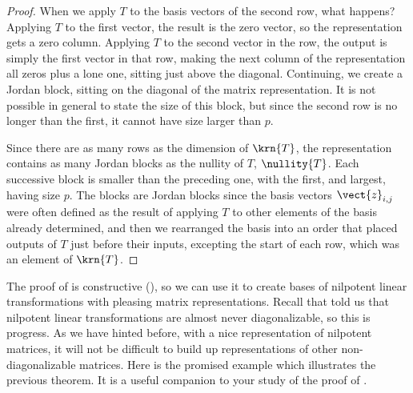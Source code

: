 \begin{proof}
%
When we apply $T$ to the basis vectors of the second row, what happens?  Applying $T$ to the first vector, the result is the zero vector, so the representation gets a zero column.  Applying $T$ to the second vector in the row, the output is simply the first vector in that row, making the next column of the representation all zeros plus a lone one, sitting just above the diagonal.  Continuing, we create a Jordan block, sitting on the diagonal of the matrix representation.  It is not possible in general to state the size of this block, but since the second row is no longer than the first, it cannot have size larger than $p$.\par
%
Since there are as many rows as the dimension of $\krn{T}$, the representation contains as many Jordan blocks as the nullity of $T$, $\nullity{T}$.  Each successive block is smaller than the preceding one, with the first, and largest, having size $p$.  The blocks are Jordan blocks since the basis vectors $\vect{z}_{i,j}$ were often defined as the result of applying $T$ to other elements of the basis already determined, and then we rearranged the basis into an order that placed outputs of $T$ just before their inputs, excepting the start of each row, which was an element of $\krn{T}$.
%
\end{proof}
%
The proof of  is constructive (), so we can use it to create bases of nilpotent linear transformations with pleasing matrix representations.  Recall that  told us that nilpotent linear transformations are almost never diagonalizable, so this is progress.  As we have hinted before, with a nice representation of nilpotent matrices, it will not be difficult to build up representations of other non-diagonalizable matrices.  Here is the promised example which illustrates the previous theorem.  It is a useful companion to your study of the proof of .
%
